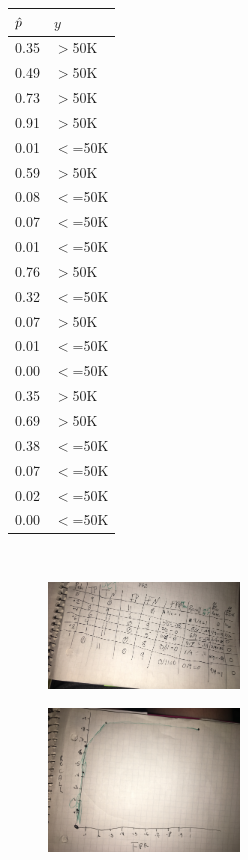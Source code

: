 \documentclass[12pt]{article}
\begin{document}
\begin{enumerate}
{\begin{table}[ht]
\footnotesize
\hspace{2cm}\begin{tabular}{ll}
  \hline
$\hat{p}$ & $y$ \\ 
  \hline
0.35 & $>$50K \\ 
  0.49 & $>$50K \\ 
  0.73 & $>$50K \\ 
  0.91 & $>$50K \\ 
  0.01 & $<$=50K \\ 
  0.59 & $>$50K \\ 
  0.08 & $<$=50K \\ 
  0.07 & $<$=50K \\ 
  0.01 & $<$=50K \\ 
  0.76 & $>$50K \\ 
  0.32 & $<$=50K \\ 
  0.07 & $>$50K \\ 
  0.01 & $<$=50K \\ 
  0.00 & $<$=50K \\ 
  0.35 & $>$50K \\ 
  0.69 & $>$50K \\ 
  0.38 & $<$=50K \\ 
  0.07 & $<$=50K \\ 
  0.02 & $<$=50K \\ 
  0.00 & $<$=50K \\ 
   \hline
\end{tabular}
\end{table}
}~
\begin{figure}[htp]
\centering
\includegraphics[width=2in]{hw5t_45.jpeg}
\end{figure}


\begin{figure}[htp]
\centering
\includegraphics[width=2in]{hw5t_4e.jpeg}
\end{figure}


\end{enumerate}
\end{document}
